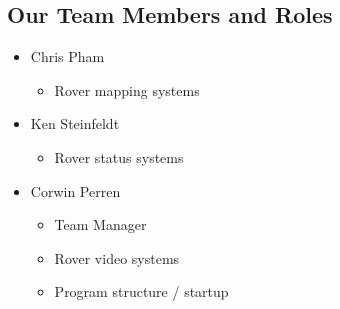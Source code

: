 \subsection{Our Team Members and Roles}
\begin{itemize}
\item Chris Pham
	\begin{itemize}
    \item Rover mapping systems
	\end{itemize}
\item Ken Steinfeldt
	\begin{itemize}
    \item Rover status systems
	\end{itemize}
\item Corwin Perren
	\begin{itemize}
	\item Team Manager
    \item Rover video systems
    \item Program structure / startup
	\end{itemize}
\end{itemize}
